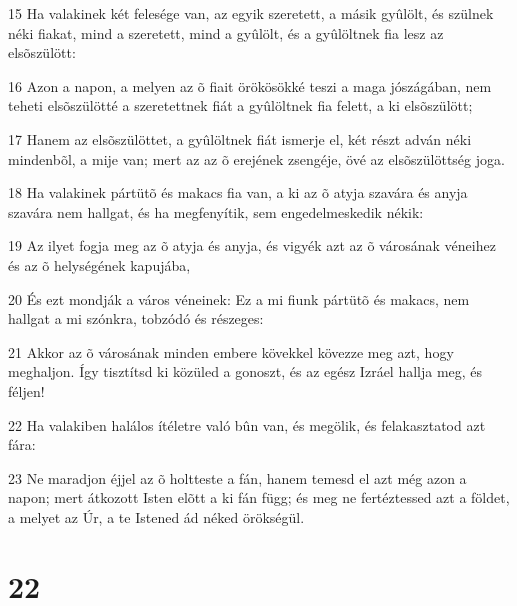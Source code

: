 \par 15 Ha valakinek két felesége van, az egyik szeretett, a másik gyûlölt, és szülnek néki fiakat, mind a szeretett, mind a gyûlölt, és a gyûlöltnek fia lesz az elsõszülött:
\par 16 Azon a napon, a melyen az õ fiait örökösökké teszi a maga jószágában, nem teheti elsõszülötté a szeretettnek fiát a gyûlöltnek fia felett, a ki elsõszülött;
\par 17 Hanem az elsõszülöttet, a gyûlöltnek fiát ismerje el, két részt adván néki mindenbõl, a mije van; mert az az õ erejének  zsengéje, övé az elsõszülöttség joga.
\par 18 Ha valakinek pártütõ és makacs fia van, a ki az õ atyja szavára és anyja szavára nem hallgat, és ha megfenyítik, sem engedelmeskedik nékik:
\par 19 Az ilyet fogja meg az õ atyja és anyja, és vigyék azt az õ városának véneihez és az õ helységének kapujába,
\par 20 És ezt mondják a város véneinek: Ez a mi fiunk pártütõ és makacs, nem hallgat a mi szónkra, tobzódó és részeges:
\par 21 Akkor az õ városának minden embere kövekkel kövezze meg azt, hogy meghaljon. Így tisztítsd ki közüled a gonoszt, és az egész Izráel hallja meg, és féljen!
\par 22 Ha valakiben halálos ítéletre való bûn van, és megölik, és felakasztatod azt fára:
\par 23 Ne maradjon éjjel az õ holtteste a fán, hanem temesd el azt még azon a napon; mert átkozott Isten elõtt  a ki fán függ; és meg ne fertéztessed azt a földet, a melyet az Úr, a te Istened ád néked örökségül.

\chapter{22}

